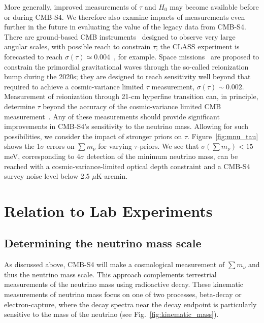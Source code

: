 More generally, improved measurements of $\tau$ and $H_0$ may become
available before or during CMB-S4.  We therefore also examine impacts of measurements even further in the future in evaluating the value of
the legacy data from CMB-S4.
%
There are ground-based CMB
instruments~\cite{Essinger-Hileman:2014pja,2014JLTP..176..691O}
designed to observe
very large angular scales, with possible reach to constrain $\tau$;
the CLASS experiment is forecasted to reach
$\sigma(\tau) \simeq 0.004$~\cite{CLASSSPIE2016}, for example.
%
Space missions~\cite{2016JLTP..184..824M,2011JCAP...07..025K} are
proposed to constrain the primordial gravitational
waves through the so-called reionization bump during the 2020s; they are designed to
reach sensitivity well beyond that required to achieve a cosmic-variance
limited $\tau$ measurement, $\sigma(\tau) \sim 0.002$.
%
Measurement of reionization through 21-cm hyperfine transition can,
in principle, determine $\tau$ beyond the accuracy of the
cosmic-variance limited CMB measurement~\cite{Liu:2015txa}.
%
Any of these measurements should provide significant improvements in CMB-S4's sensitivity to the neutrino mass. Allowing for such possibilities, we consider the impact of stronger priors on $\tau$.  Figure~\ref{fig:mnu_tau} shows the 1$\sigma$ errors on $\sum m_\nu$ for varying $\tau$-priors.  
We see that $\sigma(\sum m_\nu) < 15$ meV, corresponding to 4$\sigma$ detection of the minimum neutrino mass, can be reached with a cosmic-variance-limited optical depth constraint and a CMB-S4 survey noise level below 2.5 $\mu$K-arcmin. 












\section{Relation to Lab Experiments}\label{sec:lab}


\subsection{Determining the neutrino mass scale}
As discussed above, CMB-S4 will make a cosmological measurement of $\sum m_\nu$ and thus the neutrino mass scale. This approach complements terrestrial measurements of the neutrino mass using radioactive decay. These kinematic measurements of neutrino mass focus on one of two processes, beta-decay or electron-capture, where the decay spectra near the decay endpoint is particularly sensitive to the mass of the neutrino (see Fig.~\ref{fig:kinematic_mass}).

